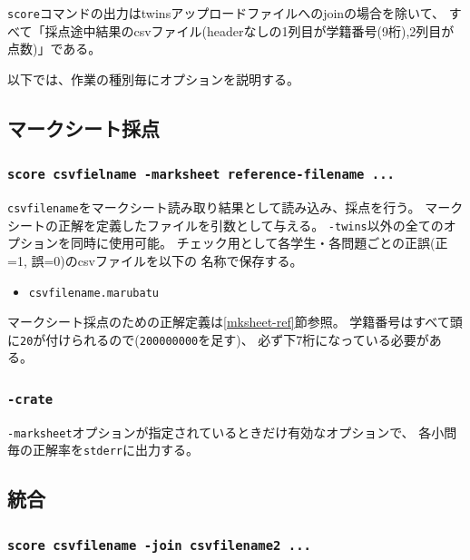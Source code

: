 \texttt{score}コマンドの出力はtwinsアップロードファイルへのjoinの場合を除いて、
すべて「採点途中結果のcsvファイル(headerなしの1列目が学籍番号(9桁),2列目が点数)」である。

以下では、作業の種別毎にオプションを説明する。

\subsection{マークシート採点}
\label{マークシート採点}

\subsubsection{\texttt{score csvfielname -marksheet reference-filename ...}}
\label{scorecsvfielname-marksheetreference-filename...}

\texttt{csvfilename}をマークシート読み取り結果として読み込み、採点を行う。
マークシートの正解を定義したファイルを引数として与える。
\texttt{-twins}以外の全てのオプションを同時に使用可能。
チェック用として各学生・各問題ごとの正誤(正=1, 誤=0)のcsvファイルを以下の
名称で保存する。

\begin{itemize}
\item \texttt{csvfilename.marubatu}

\end{itemize}

マークシート採点のための正解定義は\ref{mksheet-ref}節参照。
学籍番号はすべて頭に\texttt{20}が付けられるので(\texttt{200000000}を足す)、
必ず下7桁になっている必要がある。

\subsubsection{\texttt{-crate}}
\label{-crate}

\texttt{-marksheet}オプションが指定されているときだけ有効なオプションで、
各小問毎の正解率を\texttt{stderr}に出力する。

\subsection{統合}
\label{統合}

\subsubsection{\texttt{score csvfilename -join csvfilename2 ...}}
\label{scorecsvfilename-joincsvfilename2...}

